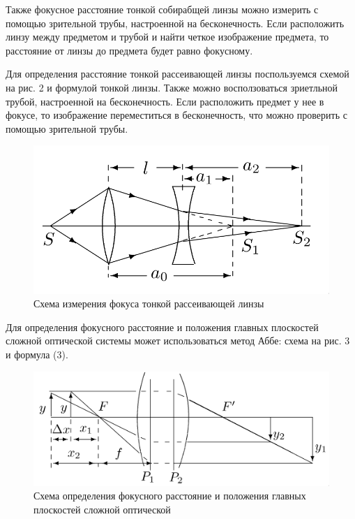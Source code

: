 \documentclass[a4paper,12pt]{article}
\theoremstyle{definition}
\begin{document}
\noindent
Также фокусное расстояние тонкой собирабщей линзы можно измерить с помощью зрительной трубы, настроенной на бесконечность. Если расположить линзу между предметом и трубой и найти четкое изображение предмета, то расстояние от линзы до предмета будет равно фокусному.

\noindent
Для определения расстояние тонкой рассеивающей линзы поспользуемся схемой на рис. 2 и формулой тонкой линзы. Также можно восползоваться зриетльной трубой, настроенной на бесконечность. Если расположить предмет у нее в фокусе, то изображение переместиться в бесконечность, что можно проверить с помощью зрительной трубы.

\begin{figure}[H]
    \centering
    \includegraphics[scale=0.35]{pic_2.png}
    \caption{Схема измерения фокуса тонкой рассеивающей линзы}
\end{figure}

\noindent
Для определения фокусного расстояние и положения главных плоскостей сложной оптической системы может использоваться метод Аббе: схема на рис. 3 и формула (3).

\begin{figure}[H]
    \centering
    \includegraphics[scale=0.3]{pic_3.png}
    \caption{Схема определения фокусного расстояние и положения главных плоскостей сложной оптической}
\end{figure}
\end{document}
